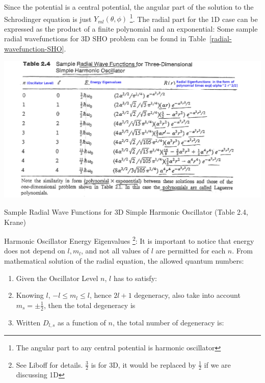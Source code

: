 \documentclass{school-22.101-notes}
\date{November 7, 2011}
\begin{document}
\maketitle

Since the potential is a central potential, the angular part of the solution to the Schrodinger equation is just $Y_{ml} (\theta, \phi)$ \footnote{The angular part to any central potential is harmonic oscillator}. The radial part for the 1D case can be expressed as the product of a finite polynomial and an exponential: 
Some sample radial wavefunctions for 3D SHO problem can be found in Table~\ref{radial-wavefunction-SHO}. 

\begin{table}[h!]
    \centering
    \includegraphics[width=6in]{images/shell/radial-wavefunction-SHO.png}
    \caption{Sample Radial Wave Functions for 3D Simple Harmonic Oscillator (Table 2.4, Krane)}
    \label{radial-wavefunction-SHO}
\end{table}

Harmonic Oscillator Energy Eigenvalues \footnote{See Liboff for details. $\frac{3}{2}$ is for 3D, it would be replaced by $\frac{1}{2}$ if we are discussing 1D}: 
It is important to notice that energy does not depend on $l, m_l$, and not all values of $l$ are permitted for each $n$. From mathematical solution of the radial equation, the allowed quantum numbers: 
\begin{enumerate}
\item Given the Oscillator Level $n$, $l$ has to satisfy:
\item Knowing $l$, $-l \le m_l \le l$, hence $2l+1$ degeneracy, also take into account $m_s = \pm \frac{1}{2}$, then the total degeneracy is 
\item Written $D_{l,s}$ as a function of $n$, the total number of degeneracy is: 
\end{enumerate}
\end{document}
